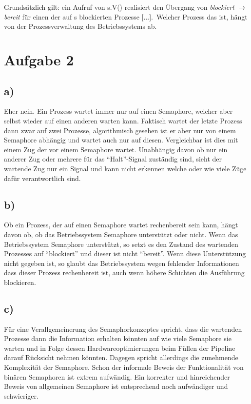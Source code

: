 \documentclass[11pt,a4paper,DIV=10,]{scrartcl}
\begin{document}
Grundsätzlich gilt: \glqq[...] ein Aufruf von s.V() realisiert den Übergang von \textit{blockiert} $\rightarrow$ \textit{bereit} für einen der auf s blockierten Prozesse [...]\cite[vgl.][S. 55]{Maurer.2012}.\grqq\ Welcher Prozess das ist, hängt von der Prozessverwaltung des Betriebssystems ab.

\section*{Aufgabe 2}
\subsection*{a)}
Eher nein. Ein Prozess wartet immer nur auf einen Semaphore, welcher aber selbst wieder auf einen anderen warten kann. Faktisch wartet der letzte Prozess dann zwar auf zwei Prozesse, algorithmisch gesehen ist er aber nur von einem Semaphore abhängig und wartet auch nur auf diesen. Vergleichbar ist dies mit einem Zug der vor einem Semaphore wartet. Unabhängig davon ob nur ein anderer Zug oder mehrere für das ``Halt''-Signal zuständig sind, sieht der wartende Zug nur ein Signal und kann nicht erkennen welche oder wie viele Züge dafür verantwortlich sind. 
\subsection*{b)}
Ob ein Prozess, der auf einen Semaphore wartet rechenbereit sein kann, hängt davon ob, ob das Betriebssystem Semaphore unterstützt oder nicht. 
Wenn das Betriebssystem Semaphore unterstützt, so setzt es den Zustand des wartenden Prozesses auf ``blockiert'' und dieser ist nicht ``bereit''. Wenn diese Unterstützung nicht gegeben ist, so glaubt das Betriebssystem wegen fehlender Informationen dass dieser Prozess rechenbereit ist, auch wenn höhere Schichten die Ausführung blockieren. 
\subsection*{c)}
Für eine Verallgemeinerung des Semaphorkonzeptes spricht, dass die wartenden Prozesse dann die Information erhalten könnten auf wie viele Semaphore sie warten und in Folge dessen Hardwareoptimierungen beim Füllen der Pipeline darauf Rücksicht nehmen könnten. Dagegen spricht allerdings die zunehmende Komplexität der Semaphore. Schon der informale Beweis der Funktionalität von binären Semaphoren ist extrem aufwändig. Ein korrekter und hinreichender Beweis von allgemeinen Semaphore ist entsprechend noch aufwändiger und schwieriger. 
\end{document}
